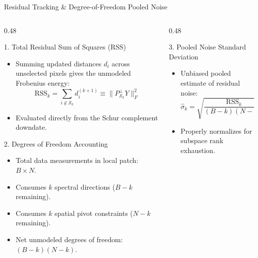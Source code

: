 \documentclass[aspectratio=169, 10pt]{beamer}
\begin{document}
\begin{frame}{Residual Tracking \& Degree-of-Freedom Pooled Noise}
  \begin{columns}[T]
    \begin{column}{0.48\textwidth}
      \begin{block}{1. Total Residual Sum of Squares (RSS)}
        \footnotesize
        \begin{itemize}\setlength{\itemsep}{2pt}
          \item Summing updated distances $d_i$ across unselected pixels gives the unmodeled Frobenius energy:
          $$\text{RSS}_k = \sum_{i \notin \mathcal{S}_k} d_i^{(k+1)} \equiv \|P_{\mathcal{S}_k}^\perp Y\|_F^2$$
          \item Evaluated directly from the Schur complement downdate.
        \end{itemize}
      \end{block}

      \begin{block}{2. Degrees of Freedom Accounting}
        \footnotesize
        \begin{itemize}\setlength{\itemsep}{2pt}
          \item Total data measurements in local patch: $B \times N$.
          \item Consumes $k$ spectral directions ($B - k$ remaining).
          \item Consumes $k$ spatial pivot constraints ($N - k$ remaining).
          \item Net unmodeled degrees of freedom: $(B - k)(N - k)$.
        \end{itemize}
      \end{block}
    \end{column}

    \begin{column}{0.48\textwidth}
      \begin{block}{3. Pooled Noise Standard Deviation}
        \footnotesize
        \begin{itemize}\setlength{\itemsep}{2pt}
          \item Unbiased pooled estimate of residual noise:
          $$\hat{\sigma}_k = \sqrt{\frac{\text{RSS}_k}{(B - k)(N - k)}}$$
          \item Properly normalizes for subspace rank exhaustion.
        \end{itemize}
      \end{block}


\end{column}
\end{columns}
\end{frame}
\end{document}
